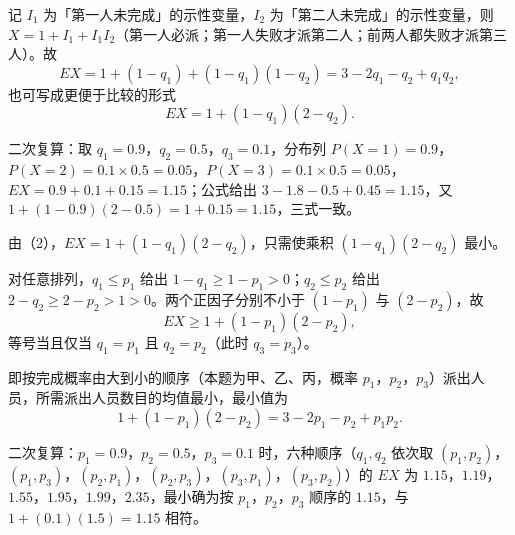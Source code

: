 \begin{answer}
记 $I_1$ 为「第一人未完成」的示性变量，$I_2$ 为「第二人未完成」的示性变量，则 $X=1+I_1+I_1I_2$（第一人必派；第一人失败才派第二人；前两人都失败才派第三人）。故
\nopagebreak[4]
\[EX=1+(1-q_1)+(1-q_1)(1-q_2)=3-2q_1-q_2+q_1q_2,\]
也可写成更便于比较的形式
\nopagebreak[4]
\[EX=1+(1-q_1)(2-q_2).\]

二次复算：取 $q_1=0.9$，$q_2=0.5$，$q_3=0.1$，分布列 $P(X=1)=0.9$，$P(X=2)=0.1\times0.5=0.05$，$P(X=3)=0.1\times0.5=0.05$，$EX=0.9+0.1+0.15=1.15$；公式给出 $3-1.8-0.5+0.45=1.15$，又 $1+(1-0.9)(2-0.5)=1+0.15=1.15$，三式一致。

由（2），$EX=1+(1-q_1)(2-q_2)$，只需使乘积 $(1-q_1)(2-q_2)$ 最小。

对任意排列，$q_1\leqslant p_1$ 给出 $1-q_1\geqslant1-p_1>0$；$q_2\leqslant p_2$ 给出 $2-q_2\geqslant2-p_2>1>0$。两个正因子分别不小于 $(1-p_1)$ 与 $(2-p_2)$，故
\nopagebreak[4]
\[EX\geqslant1+(1-p_1)(2-p_2),\]
等号当且仅当 $q_1=p_1$ 且 $q_2=p_2$（此时 $q_3=p_3$）。

即按完成概率由大到小的顺序（本题为甲、乙、丙，概率 $p_1$，$p_2$，$p_3$）派出人员，所需派出人员数目的均值最小，最小值为
\nopagebreak[4]
\[1+(1-p_1)(2-p_2)=3-2p_1-p_2+p_1p_2.\]

二次复算：$p_1=0.9$，$p_2=0.5$，$p_3=0.1$ 时，六种顺序（$q_1,q_2$ 依次取 $(p_1,p_2)$，$(p_1,p_3)$，$(p_2,p_1)$，$(p_2,p_3)$，$(p_3,p_1)$，$(p_3,p_2)$）的 $EX$ 为 $1.15$，$1.19$，$1.55$，$1.95$，$1.99$，$2.35$，最小确为按 $p_1$，$p_2$，$p_3$ 顺序的 $1.15$，与 $1+(0.1)(1.5)=1.15$ 相符。




\end{answer}
